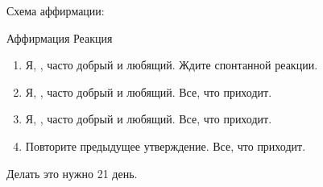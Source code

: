\documentclass[10pt, fleqn]{article}
\begin{document}
Схема аффирмации:

Аффирмация \underline{\hspace*{4cm}} Реакция
\begin{enumerate}
\item Я, \underline{\hspace*{2cm}}, часто добрый и любящий. Ждите спонтанной реакции.
\item Я, \underline{\hspace*{2cm}}, часто добрый и любящий. Все, что приходит.
\item Я, \underline{\hspace*{2cm}}, часто добрый и любящий. Все, что приходит.
\item Повторите предыдущее утверждение. Все, что приходит.
\end{enumerate}
	
Делать это нужно 21 день.

\end{document}
